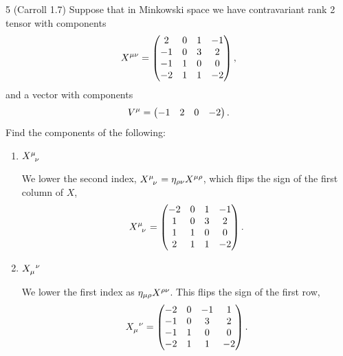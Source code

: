 \documentclass[11pt]{article}
\begin{document}
\begin{problem}{5 (Carroll 1.7)}
	Suppose that in Minkowski space we have contravariant rank 2 tensor with components
	\begin{equation}
		\label{eq:1}
		\tensor{X}{^{\mu\nu}_{}} = \begin{pmatrix}
			2  & 0 & 1 & -1 \\
			-1 & 0 & 3 & 2  \\
			-1 & 1 & 0 & 0  \\
			-2 & 1 & 1 & -2
		\end{pmatrix},
	\end{equation}
	and a vector with components
	\begin{equation}
		\label{eq:2}
		\tensor{V}{^{\mu}_{}} = \begin{pmatrix}
			-1 & 2 & 0 & -2
		\end{pmatrix}.
	\end{equation}
	Find the components of the following:
	\begin{enumerate}[label=(\alph*)]
		\item \( \tensor{X}{^{\mu}_{\nu}} \)
\begin{answer}
		      We lower the second index, \( \tensor{X}{^{\mu}_{\nu}} = \eta_{\rho\nu} \tensor{X}{^{\mu\rho}}  \), which flips the sign of the first column of \( X \),
		      \begin{equation}
		      \tensor{X}{^{\mu}_{\nu}} = \begin{pmatrix}
		          -2 & 0 & 1 & -1 \\
		          1 & 0 & 3 & 2 \\
		          1 & 1 & 0 & 0 \\
		          2 & 1 & 1 & -2
		      \end{pmatrix}.
		      \end{equation}
		      \end{answer}
		\item \( \tensor{X}{_{\mu}^{\nu}} \)
\begin{answer}
  We lower the first index as \( \eta_{\mu\rho} \tensor{X}{^{\rho\nu}} \).
  This flips the sign of the first row,
		      \begin{equation}
		      \tensor{X}{_{\mu}^{\nu}} = \begin{pmatrix}
		          -2 & 0 & -1 & 1 \\
		          -1 & 0 & 3 & 2 \\
		          -1 & 1 & 0 & 0 \\
		          -2 & 1 & 1 & -2
		      \end{pmatrix}.

\end{equation}
\end{answer}
\end{enumerate}
\end{problem}
\end{document}

